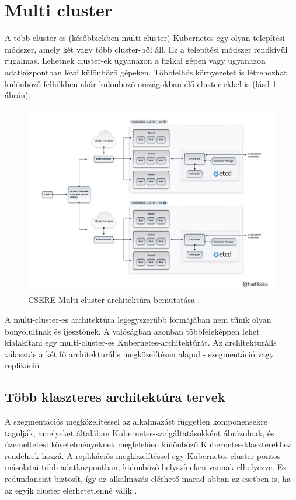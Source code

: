 \newpage

\section{Multi cluster}
A több cluster-es (későbbiekben multi-cluster) Kubernetes egy olyan telepítési módszer, amely két vagy több cluster-ből áll.
Ez a telepítési módszer rendkívül rugalmas. Lehetnek cluster-ek ugyanazon a fizikai gépen vagy ugyanazon adatközpontban lévő különböző gépeken.
Többfelhős környezetet is létrehozhat különböző felhőkben akár különböző országokban élő cluster-ekkel is (lásd \ref{multi-cluster} ábrán).

\begin{figure}[ht]
    \centering
         \includegraphics[width=1.0\textwidth]{figures/istio/multicluster.png}
          \caption{CSERE Multi-cluster architektúra bemutatása \cite{multicluster}.}
           \label{multi-cluster}
\end{figure}

A multi-cluster-es architektúra legegyszerűbb formájában nem tűnik olyan bonyolultnak és ijesztőnek.
A valóságban azonban többféleképpen lehet kialakítani egy multi-cluster-es Kubernetes-architektúrát.
Az architekturális választás a két fő architekturális megközelítésen alapul - szegmentáció vagy replikáció \cite{multicluster}.

\subsection{Több klaszteres architektúra tervek}
A szegmentációs megközelítéssel az alkalmazást független komponensekre tagolják, amelyeket általában Kubernetes-szolgáltatásokként ábrázolnak, és üzemeltetési követelményeknek megfelelően különböző Kubernetes-klaszterekhez rendelnek hozzá.
A replikációs megközelítéssel egy Kubernetes cluster pontos másolatai több adatközpontban, különböző helyszíneken vannak elhelyezve.
Ez redundanciát biztosít, így az alkalmazás elérhető marad abban az esetben is, ha az egyik cluster elérhetetlenné válik \cite{multicluster}.

